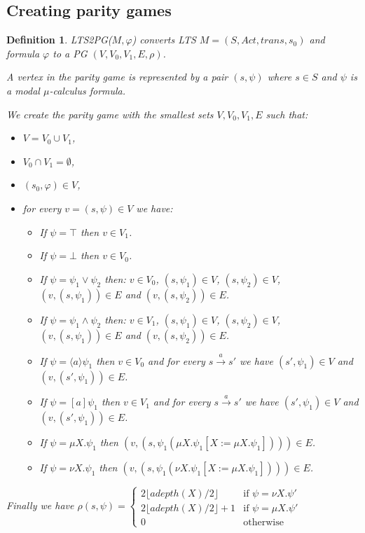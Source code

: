 \documentclass[]{article}
\newtheorem{definition}{Definition}[section]
\begin{document}
\subsection{Creating parity games}
\begin{definition}\cite{Bradfield2018}
	LTS2PG($M, \varphi$) converts LTS $M = (S, Act, trans, s_0)$ and formula $\varphi$ to a PG $(V, V_0, V_1, E, \rho)$.
	
	A vertex in the parity game is represented by a pair $(s, \psi)$ where $s \in S$ and $\psi$ is a modal $\mu$-calculus formula.
	
	We create the parity game with the smallest sets $V, V_0, V_1, E$ such that:
	\begin{itemize}
		\item $V = V_0 \cup V_1$,
		\item $V_0 \cap V_1 = \emptyset$, 
		\item $(s_0, \varphi) \in V$,
		\item for every $v = (s, \psi) \in V$ we have:
		\begin{itemize}
			\item If $\psi = \top$ then $v \in V_1$.
			\item If $\psi = \bot$ then $v \in V_0$.
			\item If $\psi = \psi_1 \vee \psi_2$ then:
				\subitem $v \in V_0$,
				\subitem $(s, \psi_1) \in V$,
				\subitem $(s, \psi_2) \in V$,
				\subitem $(v, (s,\psi_1)) \in E$ and
				\subitem $(v, (s,\psi_2)) \in E$.
			\item If $\psi = \psi_1 \wedge \psi_2$ then:
				\subitem $v \in V_1$,
				\subitem $(s, \psi_1) \in V$,
				\subitem $(s, \psi_2) \in V$,
				\subitem $(v, (s,\psi_1)) \in E$ and
				\subitem $(v, (s,\psi_2)) \in E$.
			\item If $\psi = \langle a \rangle \psi_1$ then $v \in V_0$ and for every $s \xrightarrow{ a} s'$ we have $(s', \psi_1) \in V$ and $(v, (s', \psi_1)) \in E$.
			\item If $\psi = [ a ] \psi_1$ then $v \in V_1$ and for every $s \xrightarrow{ a} s'$ we have $(s', \psi_1) \in V$ and $(v, (s', \psi_1)) \in E$.
			\item If $\psi = \mu X. \psi_1$ then $(v, (s, \psi_1(\mu X. \psi_1[X:=\mu X. \psi_1]))) \in E$.
			\item If $\psi = \nu X. \psi_1$ then $(v, (s, \psi_1(\nu X. \psi_1[X:=\mu X. \psi_1]))) \in E$.
		\end{itemize}
	\end{itemize}

Finally we have $\rho(s, \psi) = \begin{cases}
2 \lfloor adepth(X) / 2 \rfloor & \text{if } \psi = \nu X. \psi'\\
2 \lfloor adepth(X) / 2 \rfloor + 1 & \text{if } \psi = \mu X. \psi'\\
0 & \text{otherwise}
\end{cases}$
\end{definition}
\end{document}

